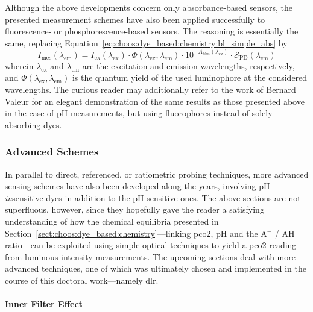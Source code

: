 Although the above developments concern only absorbance-based sensors, the presented measurement schemes have also been applied successfully to fluorescence- or phosphorescence-based sensors\cite{uttamlal1995, ge2003, ge2014, wang2020}. The reasoning is essentially the same, replacing Equation~\ref{eq:choos:dye_based:chemistry:bl_simple_abs} by
\begin{equation}
	I_\text{mes}(\lambda_\text{em}) = I_\text{ex}(\lambda_\text{ex}) \cdot \Phi(\lambda_\text{ex}, \lambda_\text{em}) \cdot 10^{-A_\text{film}(\lambda_\text{ex})} \cdot \mathcal{S}_\text{PD}(\lambda_\text{em})
\end{equation}
wherein $\lambda_\text{ex}$ and $\lambda_\text{em}$ are the excitation and emission wavelengths, respectively, and $\Phi(\lambda_\text{ex}, \lambda_\text{em})$ is the quantum yield of the used luminophore at the considered wavelengths. The curious reader may additionally refer to the work of Bernard Valeur\cite[p.~338]{valeur2001_chap10} for an elegant demonstration of the same results as those presented above in the case of pH measurements, but using fluorophores instead of solely absorbing dyes.

\subsubsection{Advanced Schemes}\label{sect:choos:dye_based:optical_schemes:advanced}

In parallel to direct, referenced, or ratiometric probing techniques, more advanced sensing schemes have also been developed along the years, involving pH-\emph{in}sensitive dyes in addition to the pH-sensitive ones. The above sections are not superfluous, however, since they hopefully gave the reader a satisfying understanding of how the chemical equilibria presented in Section~\ref{sect:choos:dye_based:chemistry}---linking \gls{pco2}, pH and the A$^-$ / AH ratio---can be exploited using simple optical techniques to yield a \gls{pco2} reading from luminous intensity measurements. The upcoming sections deal with more advanced techniques, one of which was ultimately chosen and implemented in the course of this doctoral work---namely \gls{dlr}.

\paragraph{Inner Filter Effect}\label{subsect:choos:dye_based:optical_schemes:ife}\mbox{}\\

